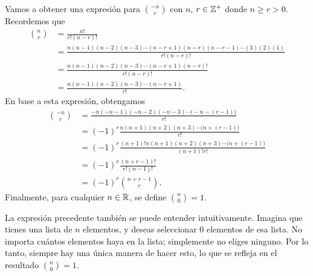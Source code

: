 \begin{BOX}
    Vamos a obtener una expresión para $\displaystyle \binom{-n}{r}$ con $n$, $r \in \ZZ[+]$ donde $n \geq r > 0$. Recordemos que
    \begin{align*}
        \binom{n}{r} & = \frac{n!}{r!(n-r)!} \\
        & = \frac{n(n-1)(n-2)(n-3) \cdots (n-r+1)(n-r)(n-r-1) \cdots (3)(2)(1)}{r!(n-r)!} \\
        & = \frac{n(n-1)(n-2)(n-3) \cdots (n-r+1)(n-r)!}{r!(n-r)!} \\
        & = \frac{n(n-1)(n-2)(n-3) \cdots (n-r+1)}{r!}.
    \end{align*}
    En base a esta expresión, obtengamos
    \begin{align*}
        \binom{-n}{r} & = \frac{-n(-n-1)(-n-2)(-n-3) \cdots \big(-n-(r-1)\big)}{r!} \\
        & = (-1)^r \frac{n(n+1)(n+2)(n+3) \cdots \big(n+(r-1)\big)}{r!} \\
        & = (-1)^r \frac{(n+1)!n(n+1)(n+2)(n+3) \cdots \big(n+(r-1)\big)}{(n+1)!r!} \\
        & = (-1)^r \frac{(n+r-1)!}{r!(n-1)!} \\
        & = (-1)^r \binom{n+r-1}{r}.
    \end{align*}
    Finalmente, para cualquier $n \in \RR$, se define $\displaystyle \binom{n}{0} = 1$.
\end{BOX}

\begin{obs}{}{}
    La expresión precedente también se puede entender intuitivamente. Imagina que tienes una lista de $n$ elementos, y deseas seleccionar $0$ elementos de esa lista. No importa cuántos elementos haya en la lista; simplemente no eliges ninguno. Por lo tanto, siempre hay una única manera de hacer esto, lo que se refleja en el resultado $\displaystyle \binom{n}{0} = 1$.
\end{obs}

\newpage

